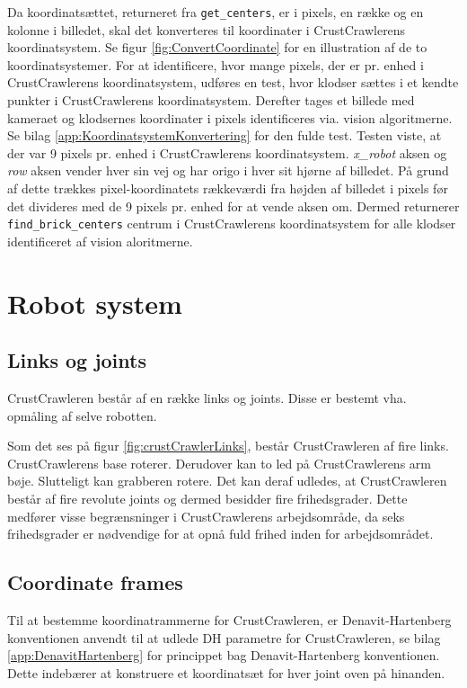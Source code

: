 Da koordinatsættet, returneret fra \texttt{get\_centers}, er i pixels, en række og en kolonne i billedet, skal det konverteres til koordinater i CrustCrawlerens koordinatsystem.
Se figur \vref{fig:ConvertCoordinate} for en illustration af de to koordinatsystemer.
For at identificere, hvor mange pixels, der er pr. enhed i CrustCrawlerens koordinatsystem, udføres en test, hvor klodser sættes i et kendte punkter i CrustCrawlerens koordinatsystem.
Derefter tages et billede med kameraet og klodsernes koordinater i pixels identificeres via. vision algoritmerne.
Se bilag \vref{app:KoordinatsystemKonvertering} for den fulde test.
Testen viste, at der var 9 pixels pr. enhed i CrustCrawlerens koordinatsystem.
\textit{x\_robot} aksen og \textit{row} aksen vender hver sin vej og har origo i hver sit hjørne af billedet.
På grund af dette trækkes pixel-koordinatets rækkeværdi fra højden af billedet i pixels før det divideres med de 9 pixels pr. enhed for at vende aksen om.
Dermed returnerer \texttt{find\_brick\_centers} centrum i CrustCrawlerens koordinatsystem for alle klodser identificeret af vision aloritmerne.

\newpage
\section{Robot system}
\subsection{Links og joints}
CrustCrawleren består af en række links og joints. Disse er bestemt vha. opmåling af selve robotten. 


Som det ses på figur \ref{fig:crustCrawlerLinks}, består CrustCrawleren af fire links. CrustCrawlerens base roterer. Derudover kan to led på CrustCrawlerens arm bøje. Slutteligt kan grabberen rotere. Det kan deraf udledes, at CrustCrawleren består af fire revolute joints og dermed besidder fire frihedsgrader. Dette medfører visse begrænsninger i CrustCrawlerens arbejdsområde, da seks frihedsgrader er nødvendige for at opnå fuld frihed inden for arbejdsområdet.

\subsection{Coordinate frames}
Til at bestemme koordinatrammerne for CrustCrawleren, er Denavit-Hartenberg konventionen anvendt til at udlede DH parametre for CrustCrawleren, se bilag \vref{app:DenavitHartenberg} for princippet bag Denavit-Hartenberg konventionen. Dette indebærer at konstruere et koordinatsæt for hver joint oven på hinanden. 

